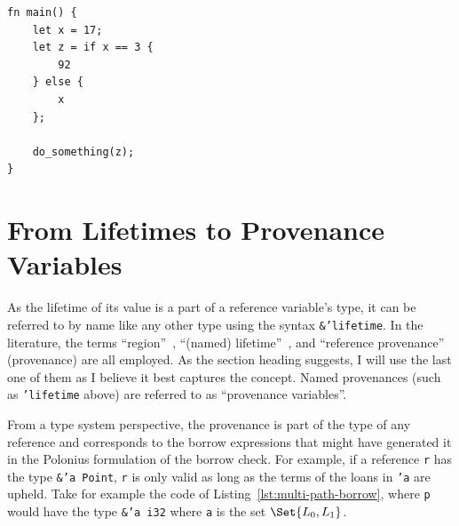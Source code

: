 \documentclass[11pt,a4paper,twoside,openany]{report}
\newcommand{\fixme}[1] {{\color{red}#1}}
\newenvironment{sourcecode}{\captionsetup{type=listing}}{}
\newcommand{\InRust}[1]{\texttt{#1}}
\begin{document}


\begin{sourcecode}
  \label{lst:mir-example-input}
\begin{verbatim}
fn main() {
    let x = 17;
    let z = if x == 3 {
        92
    } else {
        x
    };

    do_something(z);
}
\end{verbatim}
\end{sourcecode}

\section{From Lifetimes to Provenance Variables}
\label{sec:reference-provenance}

As the lifetime of its value is a part of a reference variable's type, it can be
referred to by name like any other type using the syntax \InRust{&'lifetime}. In
the literature, the terms ``region''~\cite{matsakis_alias-based_2018}, ``(named)
lifetime''~\nocite{noauthor_rfc_2019}, and ``reference
provenance''~\cite{weiss_oxide:_2019} (provenance) are all employed. As the
section heading suggests, I will use the last one of them as I believe it best
captures the concept. Named provenances (such as \InRust{'lifetime} above) are
referred to as ``provenance variables''.

From a type system perspective, the provenance is part of the type of any
reference and corresponds to the borrow expressions that might have generated it
in the Polonius formulation of the borrow check. For example, if a reference
\InRust{r} has the type \InRust{&'a Point}, \InRust{r} is only valid as long as
the terms of the loans in \InRust{'a} are upheld. Take for example the code of
Listing~\ref{lst:multi-path-borrow}, where \InRust{p} would have the type
\InRust{&'a i32} where \InRust{a} is the set $\Set{L_0, L_1}$.
\end{document}
